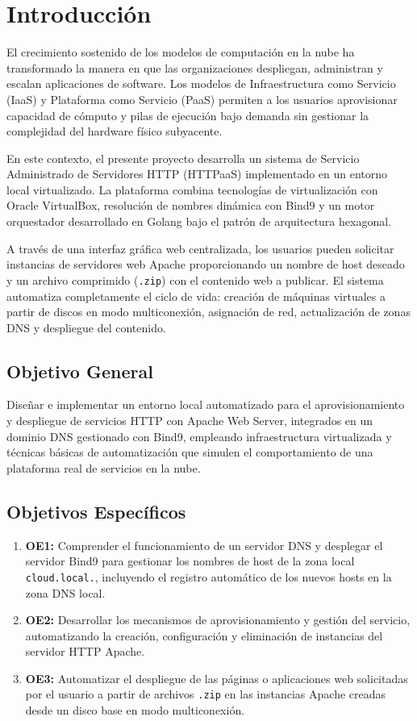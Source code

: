 \section{Introducción}

El crecimiento sostenido de los modelos de computación en la nube ha transformado la manera en que las organizaciones despliegan, administran y escalan aplicaciones de software. Los modelos de Infraestructura como Servicio (IaaS) y Plataforma como Servicio (PaaS) permiten a los usuarios aprovisionar capacidad de cómputo y pilas de ejecución bajo demanda sin gestionar la complejidad del hardware físico subyacente.

En este contexto, el presente proyecto desarrolla un sistema de Servicio Administrado de Servidores HTTP (HTTPaaS) implementado en un entorno local virtualizado. La plataforma combina tecnologías de virtualización con Oracle VirtualBox, resolución de nombres dinámica con Bind9 y un motor orquestador desarrollado en Golang bajo el patrón de arquitectura hexagonal. 

A través de una interfaz gráfica web centralizada, los usuarios pueden solicitar instancias de servidores web Apache proporcionando un nombre de host deseado y un archivo comprimido (\texttt{.zip}) con el contenido web a publicar. El sistema automatiza completamente el ciclo de vida: creación de máquinas virtuales a partir de discos en modo multiconexión, asignación de red, actualización de zonas DNS y despliegue del contenido.

\subsection{Objetivo General}
Diseñar e implementar un entorno local automatizado para el aprovisionamiento y despliegue de servicios HTTP con Apache Web Server, integrados en un dominio DNS gestionado con Bind9, empleando infraestructura virtualizada y técnicas básicas de automatización que simulen el comportamiento de una plataforma real de servicios en la nube.

\subsection{Objetivos Específicos}
\begin{enumerate}
    \item \textbf{OE1:} Comprender el funcionamiento de un servidor DNS y desplegar el servidor Bind9 para gestionar los nombres de host de la zona local \texttt{cloud.local.}, incluyendo el registro automático de los nuevos hosts en la zona DNS local.
    \item \textbf{OE2:} Desarrollar los mecanismos de aprovisionamiento y gestión del servicio, automatizando la creación, configuración y eliminación de instancias del servidor HTTP Apache.
    \item \textbf{OE3:} Automatizar el despliegue de las páginas o aplicaciones web solicitadas por el usuario a partir de archivos \texttt{.zip} en las instancias Apache creadas desde un disco base en modo multiconexión.
\end{enumerate}

